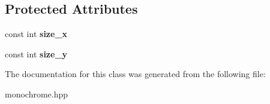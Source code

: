 \subsection*{Protected Attributes}
\begin{DoxyCompactItemize}
\item 
const int {\bfseries size\+\_\+x}\hypertarget{classmonochrome_display_a76aee278fd30daf328f081020af3d843}{}\label{classmonochrome_display_a76aee278fd30daf328f081020af3d843}

\item 
const int {\bfseries size\+\_\+y}\hypertarget{classmonochrome_display_ab3eccf828513020fd3e62e23c531d594}{}\label{classmonochrome_display_ab3eccf828513020fd3e62e23c531d594}

\end{DoxyCompactItemize}


The documentation for this class was generated from the following file\+:\begin{DoxyCompactItemize}
\item 
monochrome.\+hpp\end{DoxyCompactItemize}
